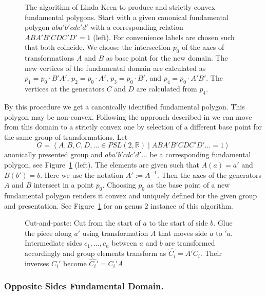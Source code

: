 \documentclass[Thesis.tex]{subfiles}
\begin{document}
\begin{figure}
\centering
{}
\caption{The algorithm of Linda Keen to produce and strictly convex fundamental polygons. Start with a given canonical fundamental polygon $aba'b'cdc'd'$ with a corresponding relation $ABA'B'CDC'D'=1$ (left). For convenience labels are chosen such that both coincide. We choose the intersection $p_0$ of the axes of transformations $A$ and $B$ as base point for the new domain. The new vertices of the fundamental domain are calculated as $p_1=p_0\cdot B'A'$, $p_2=p_0\cdot A'$, $p_3=p_0\cdot B'$, and $p_4=p_0\cdot A'B'$. The vertices at the generators $C$ and $D$ are calculated from $p_4$.}
\label{fig:keen_polygon}
\end{figure}

By this procedure we get a canonically identified fundamental polygon. This polygon may be non-convex. Following the approach described in \cite{keen1966} we can move from this domain to a strictly convex one by selection of a different base point for the same group of transformations. Let
\[G=\left<A,B,C,D,\ldots\in \mathit{PSL}(2,\mathbb R)\mid ABA'B'CDC'D'\ldots=1\right>\]
anonically presented group and $aba'b'cdc'd'\ldots$ be a corresponding fundamental polygon, see Figure~\ref{fig:keen_polygon} (left). The elements are given such that $A(a)=a'$ and $B(b')=b$. Here we use the notation $A':=A^{-1}$. Then the axes of the generators $A$ and $B$ intersect in a point $p_0$. Choosing $p_0$ as the base point of a new fundamental polygon renders it convex and uniquely defined for the given group and presentation. See Figure~\ref{fig:keen_polygon} for an genus $2$ instance of this algorithm.

\begin{figure}
\centering
\resizebox{0.5\textwidth}{!} {

}
\caption{Cut-and-paste: Cut from the start of $a$ to the start of side $b$. Glue the piece along $a'$ using transformation $A$ that moves side $a$ to $'a$. Intermediate sides $c_1,\ldots,c_n$ between $a$ and $b$ are transformed accordingly and group elements transform as $\hat{C_i}=A'C_i$. Their inverses $C_i'$ become $\hat{C_i}'=C_i'A$}
\label{fig:cut-and-paste-canonical}
\end{figure}

\subsubsection*{Opposite Sides Fundamental Domain.}
\end{document}
